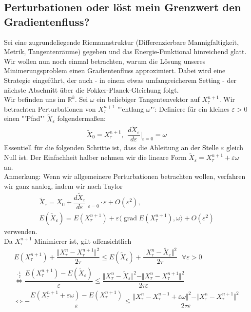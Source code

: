 \documentclass[11pt,a4paper,notitlepage]{scrreprt}
\newcommand{\RR}{\mathbb{R}}
\newcommand{\grad}{\operatorname{grad}}
\begin{document}
\subsection{Perturbationen oder löst mein Grenzwert den Gradientenfluss?}

Sei eine zugrundeliegende Riemannstruktur (Differenzierbare Mannigfaltigkeit, Metrik, Tangentenräume) gegeben und das Energie-Funktional hinreichend glatt. \\
Wir wollen nun noch einmal betrachten, warum die Lösung unseres Minimerungsproblem einen Gradientenfluss approximiert. Dabei wird eine Strategie eingeführt, der auch - in einem etwas umfangreicherem Setting - der nächste Abschnitt über die Fokker-Planck-Gleichung folgt. \\
Wir befinden uns im $\RR^k$. Sei $\omega$ ein beliebiger Tangentenvektor auf $X_\tau^{n+1}$. Wir betrachten Perturbationen von $X_\tau^{n+1}$ "'entlang $\omega$"': Definiere für ein kleines $\varepsilon>0$ einen "'Pfad"' $\tilde{X}_\varepsilon$ folgendermaßen: \\
\begin{eqnarray}
\tilde{X}_0=X_\tau^{n+1},~~\dfrac{d\tilde{X}_\varepsilon}{d\varepsilon}\Bigg|_{\varepsilon=0} =\omega
\end{eqnarray}
Essentiell für die folgenden Schritte ist, dass die Ableitung an der Stelle $\varepsilon$ gleich Null ist. Der Einfachheit halber nehmen wir die lineare Form $\tilde{X}_\varepsilon=X_\tau^{n+1}+\varepsilon\omega$ an.\\
Anmerkung: Wenn wir allgemeinere Perturbationen betrachten wollen, verfahren wir ganz analog, indem wir nach Taylor \begin{eqnarray}
\tilde{X}_\varepsilon = X_0+\dfrac{d\tilde{X}_\varepsilon}{d\varepsilon}\Bigg|_{\varepsilon=0}\cdot\varepsilon+O(\varepsilon^2),\\
E(\tilde{X}_\varepsilon)=E(X_\tau^{n+1})+\varepsilon\langle \grad E(X_\tau^{n+1}),\omega\rangle+O(\varepsilon^2) \label{b)}
\end{eqnarray}
verwenden.\\
Da $X_\tau^{n+1}$ Minimierer ist, gilt offensichtlich
\begin{eqnarray}
E(X_\tau^{n+1})+\dfrac{\Vert X_\tau^n-X_\tau^{n+1}\Vert^2}{2\tau}\leq E(\tilde{X}_\varepsilon)+\dfrac{\Vert X_\tau^n-\tilde{X}_\varepsilon\Vert^2}{2\tau}~~~\forall \varepsilon>0 \label{a)}\\
\overset{\cdot\frac{1}{\varepsilon}}\Leftrightarrow \dfrac{E(X_\tau^{n+1})-E(\tilde{X}_\varepsilon)}{\varepsilon}\leq \dfrac{\Vert X_\tau^n-\tilde{X}_\varepsilon\Vert^2-\Vert X_\tau^n-X_\tau^{n+1}\Vert^2}{2\tau\varepsilon}\\
\Leftrightarrow -\dfrac{E(X_\tau^{n+1}+\varepsilon\omega)-E(X_\tau^{n+1})}{\varepsilon}\leq \dfrac{\Vert X_\tau^n-X_\tau^{n+1}+\varepsilon\omega\Vert^2-\Vert X_\tau^n-X_\tau^{n+1}\Vert^2}{2\tau\varepsilon}
\end{eqnarray}
\end{document}
